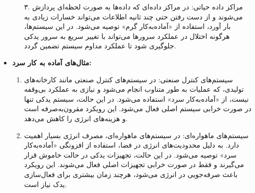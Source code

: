 \begin{qsolve}
	\begin{itemize}
		\begin{enumerate}
			\item [۳.]
			مراکز داده حیاتی: در مراکز داده‌ای که داده‌ها به صورت لحظه‌ای پردازش می‌شوند و از دست رفتن حتی چند ثانیه اطلاعات می‌تواند خسارات زیادی به بار آورد، استفاده از «آماده‌به‌کار گرم» توصیه می‌شود. در این سیستم‌ها، هرگونه اختلال در عملکرد سرورها می‌تواند با تغییر سریع به سرور یدکی جلوگیری شود تا عملکرد مداوم سیستم تضمین گردد.
		\end{enumerate}
		
		\item 
		\textbf{مثال‌های آماده به کار سرد:}\\
		\begin{enumerate}
			\item 
			سیستم‌های کنترل صنعتی: در سیستم‌های کنترل صنعتی مانند کارخانه‌های تولیدی، که عملیات به طور متناوب انجام می‌شود و نیازی به عملکرد بی‌وقفه نیست، از «آماده‌به‌کار سرد» استفاده می‌شود. در این حالت، سیستم یدکی تنها در صورت خرابی سیستم اصلی فعال می‌شود. این رویکرد مقرون‌به‌صرفه است و هزینه‌های انرژی را کاهش می‌دهد.
			
			\item 
			سیستم‌های ماهواره‌ای: در سیستم‌های ماهواره‌ای، مصرف انرژی بسیار اهمیت دارد. به دلیل محدودیت‌های انرژی در فضا، استفاده از افزونگی «آماده‌به‌کار سرد» توصیه می‌شود. در این حالت، تجهیزات یدکی در حالت خاموش قرار می‌گیرند و فقط در صورت خرابی تجهیزات اصلی فعال می‌شوند. این رویکرد باعث صرفه‌جویی در انرژی می‌شود، هرچند زمان بیشتری برای فعال‌سازی یدک نیاز است.
		\end{enumerate}
	\end{itemize}
\end{qsolve}